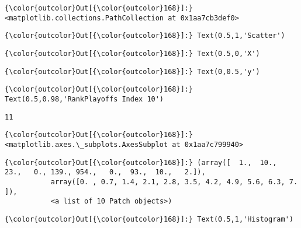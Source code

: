 \documentclass[11pt]{article}
\begin{document}
\begin{Verbatim}[commandchars=\\\{\}]
{\color{outcolor}Out[{\color{outcolor}168}]:} <matplotlib.collections.PathCollection at 0x1aa7cb3def0>
\end{Verbatim}
            
\begin{Verbatim}[commandchars=\\\{\}]
{\color{outcolor}Out[{\color{outcolor}168}]:} Text(0.5,1,'Scatter')
\end{Verbatim}
            
\begin{Verbatim}[commandchars=\\\{\}]
{\color{outcolor}Out[{\color{outcolor}168}]:} Text(0.5,0,'X')
\end{Verbatim}
            
\begin{Verbatim}[commandchars=\\\{\}]
{\color{outcolor}Out[{\color{outcolor}168}]:} Text(0,0.5,'y')
\end{Verbatim}
            
\begin{Verbatim}[commandchars=\\\{\}]
{\color{outcolor}Out[{\color{outcolor}168}]:} Text(0.5,0.98,'RankPlayoffs Index 10')
\end{Verbatim}
            
    \begin{Verbatim}[commandchars=\\\{\}]
11

    \end{Verbatim}

\begin{Verbatim}[commandchars=\\\{\}]
{\color{outcolor}Out[{\color{outcolor}168}]:} <matplotlib.axes.\_subplots.AxesSubplot at 0x1aa7c799940>
\end{Verbatim}
            
\begin{Verbatim}[commandchars=\\\{\}]
{\color{outcolor}Out[{\color{outcolor}168}]:} (array([  1.,  10.,  23.,   0., 139., 954.,   0.,  93.,  10.,   2.]),
           array([0. , 0.7, 1.4, 2.1, 2.8, 3.5, 4.2, 4.9, 5.6, 6.3, 7. ]),
           <a list of 10 Patch objects>)
\end{Verbatim}
            
\begin{Verbatim}[commandchars=\\\{\}]
{\color{outcolor}Out[{\color{outcolor}168}]:} Text(0.5,1,'Histogram')
\end{Verbatim}
            
\end{document}
